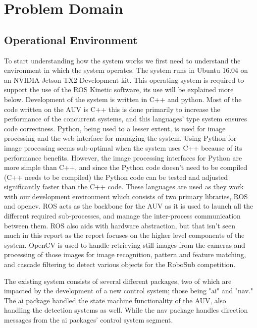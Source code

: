 \chapter{Problem Domain}

\label{Chapter2}

\section{Operational Environment}

To start understanding how the system works we first need to understand the
environment in which the system operates.
The system runs in Ubuntu 16.04 on an NVIDIA Jetson TX2 Development kit.
This operating system is required to support the use of the \gls{ROS} Kinetic
software, its use will be explained more below.
Development of the system is written in C++ and python.
Most of the code written on the AUV is C++ this is done primarily to increase
the performance of the concurrent systems, and this languages' type system
ensures code correctness.
Python, being used to a lesser extent, is used for image processing and the web
interface for managing the system.
Using Python for image processing seems sub-optimal when the system uses C++
because of its performance benefits.
However, the image processing interfaces for Python are more simple than C++,
and since the Python code doesn't need to be compiled (C++ needs to be compiled)
the Python code can be tested and adjusted significantly faster than the C++
code.
These languages are used as they work with our development environment which
consists of two primary libraries, \gls{ROS} and \gls{opencv}.
ROS acts as the backbone for the AUV as it is used to launch all the different
required sub-processes, and manage the inter-process communication between them.
ROS also aids with hardware abstraction, but that isn't seen much in this
report as the report focuses on the higher level components of the system.
OpenCV is used to handle retrieving still images from the cameras and processing
of those images for image recognition, pattern and feature matching, and cascade
filtering to detect various objects for the RoboSub competition.

The existing system consists of several different packages, two of which are
impacted by the development of a new control system; those being "ai" and "nav."
The ai package handled the state machine functionality of the AUV, also handling
the detection systems as well. While the nav package handles direction messages
from the ai packages' control system segment.

